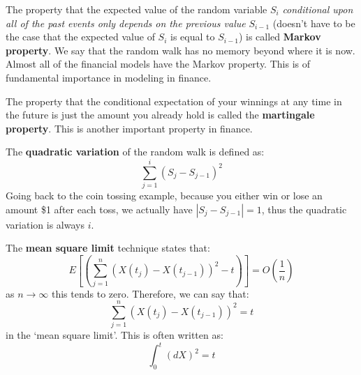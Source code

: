 The property that the expected value of the random variable $S_i$ \textit{conditional upon all of the past events only depends on the previous value} $S_{i-1}$ (doesn't have to be the case that the expected value of $S_i$ is equal to $S_{i-1}$) is called \textbf{Markov property}. We say that the random walk has no memory beyond where it is now. Almost all of the financial models have the Markov property. This is of fundamental importance in modeling in finance.

\begin{center}
\begin{footnotesize}
\end{footnotesize}
\end{center}

The property that the conditional expectation of your winnings at any time in the future is just the amount you already hold is called the \textbf{martingale property}. This is another important property in finance.

The \textbf{quadratic variation} of the random walk is defined as:
\begin{equation}
    \sum_{j = 1}^i \left( S_j - S_{j-1} \right)^2
\end{equation}
Going back to the coin tossing example, because you either win or lose an amount \$1 after each toss, we actually have $\left| S_j - S_{j-1} \right| = 1$, thus the quadratic variation is always $i$.

The \textbf{mean square limit} technique states that:
\begin{equation}
    E \left[ \left( \sum_{j=1}^n \left( X(t_j) - X(t_{j-1}) \right)^2 - t \right) \right] = O \left( \frac{1}{n} \right)
\end{equation}
as $n \rightarrow \infty$ this tends to zero. Therefore, we can say that:
\begin{equation}
    \sum_{j=1}^n \left( X(t_j) - X(t_{j-1}) \right)^2 = t
\end{equation}
in the `mean square limit'. This is often written as:
\begin{equation}
    \int_0^t (dX)^2 = t
\end{equation}



